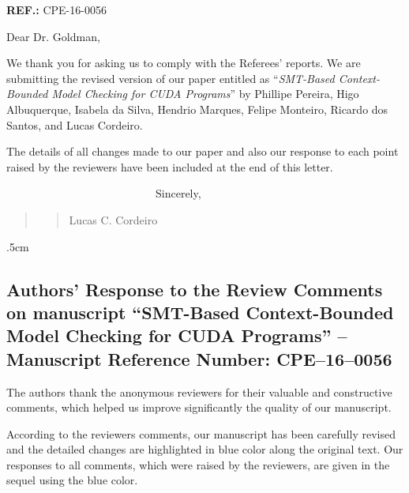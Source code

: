 \documentclass[11pt]{article}
\newcommand\vi{\vspace{\baselineskip}}
\begin{document}
\begin{flushleft}
\textbf{REF.:} CPE-16-0056
    \end{flushleft}
\vi \vi
 
\indent Dear Dr. Goldman,
\vi 

We thank you for asking us to comply with the Referees' reports. We are submitting the revised version of our paper entitled as ``{\em SMT-Based
Context-Bounded Model Checking for CUDA Programs}''  by Phillipe Pereira, Higo Albuquerque, Isabela da Silva, Hendrio Marques, Felipe Monteiro, Ricardo dos Santos, and Lucas Cordeiro.


The details of all changes made to our paper and also our response to each point raised by the reviewers have been included at the end of this letter.





\vi\vi

\indent
~~~~~~~~~~~~~~~~~~~~~~~~~~~Sincerely,\\



\begin{quote}
\begin{quote}
\begin{flushright}


\vi
\vi

Lucas C. Cordeiro~~~~~~~
\end{flushright}
\end{quote}
\end{quote}

\hoffset -1.5cm \voffset .5cm


\newpage
\subsection*{Authors'   Response to the Review Comments on manuscript ``{SMT-Based Context-Bounded Model Checking for CUDA Programs}'' -- Manuscript Reference Number: CPE--16--0056}

\vi

The authors thank the anonymous reviewers for their valuable and constructive comments, which helped us improve significantly the quality of our manuscript. 

\vi

According to the reviewers comments, our manuscript has been carefully revised and the detailed changes are highlighted in blue color along the original text. Our responses to all comments, which were raised by the reviewers, are given in the sequel using the blue color.
\end{document}
